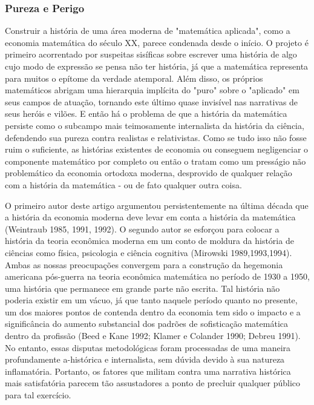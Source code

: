 \documentclass[a4paper,12pt]{article}[abntex2]
\begin{document}
\subsubsection{\textbf{Pureza e Perigo}}
Construir a história de uma área moderna de "matemática aplicada", como a economia matemática do século XX, parece condenada desde o início. O projeto é primeiro acorrentado por suspeitas sisíficas sobre escrever uma história de algo cujo modo de expressão se pensa não ter história, já que a matemática representa para muitos o epítome da verdade atemporal. Além disso, os próprios matemáticos abrigam uma hierarquia implícita do "puro" sobre o "aplicado" em seus campos de atuação, tornando este último quase invisível nas narrativas de seus heróis e vilões. E então há o problema de que a história da matemática persiste como o subcampo mais teimosamente internalista da história da ciência, defendendo sua pureza contra realistas e relativistas. Como se tudo isso não fosse ruim o suficiente, as histórias existentes de economia ou conseguem negligenciar o componente matemático por completo ou então o tratam como um presságio não problemático da economia ortodoxa moderna, desprovido de qualquer relação com a história da matemática - ou de fato qualquer outra coisa.

O primeiro autor deste artigo argumentou persistentemente na última década que a história da economia moderna deve levar em conta a história da matemática (Weintraub 1985, 1991, 1992). O segundo autor se esforçou para colocar a história da teoria econômica moderna em um conto de moldura da história de ciências como física, psicologia e ciência cognitiva (Mirowski 1989,1993,1994). Ambas as nossas preocupações convergem para a construção da hegemonia americana pós-guerra na teoria econômica matemática no período de 1930 a 1950, uma história que permanece em grande parte não escrita. Tal história não poderia existir em um vácuo, já que tanto naquele período quanto no presente, um dos maiores pontos de contenda dentro da economia tem sido o impacto e a significância do aumento substancial dos padrões de sofisticação matemática dentro da profissão (Beed e Kane 1992; Klamer e Colander 1990; Debreu 1991). No entanto, essas disputas metodológicas foram processadas de uma maneira profundamente a-histórica e internalista, sem dúvida devido à sua natureza inflamatória. Portanto, os fatores que militam contra uma narrativa histórica mais satisfatória parecem tão assustadores a ponto de precluir qualquer público para tal exercício.
\end{document}
